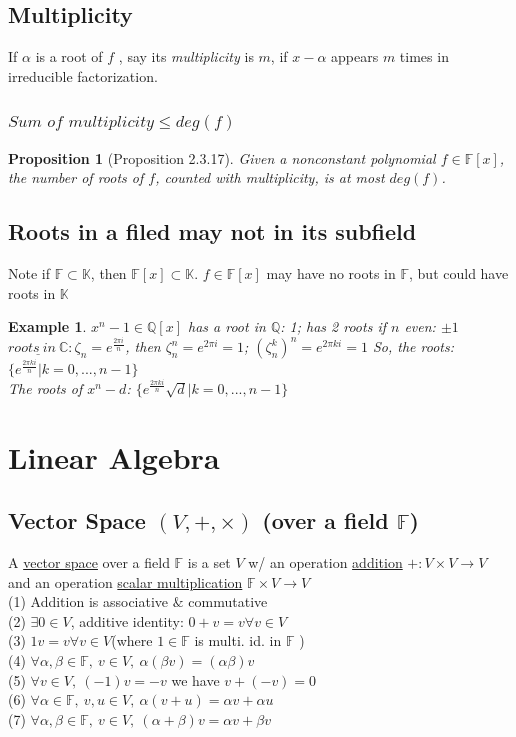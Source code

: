 \documentclass[11pt,a4paper]{article}
\newtheorem{proposition}{Proposition}
\newtheorem{example}{Example}
\begin{document}
\subsection{Multiplicity}
If $\alpha$ is a root of $f$ , say its \textit{multiplicity} is $m$, if $x-\alpha$ appears $m$ times in irreducible factorization.
\subsubsection{$\textit{Sum of multiplicity}\leq deg(f)$}
\begin{proposition}[Proposition 2.3.17]
Given a nonconstant polynomial $f\in\mathbb{F}[x]$, the number of roots of $f$, counted with multiplicity, is at most $deg(f)$.
\end{proposition}

\subsection{Roots in a filed may not in its subfield}
Note if $\mathbb{F}\subset \mathbb{K}$, then $\mathbb{F}[x]\subset\mathbb{K}$. $f\in\mathbb{F}[x]$ may have no roots in $\mathbb{F}$, but could have roots in $\mathbb{K}$
\begin{example}
    $x^n-1\in\mathbb{Q}[x]$ has a root in $\mathbb{Q}$: 1; has 2 roots if $n$ even: $\pm 1$\\
    $\underline{roots\ in\ \mathbb{C}}:\zeta_n=e^{\frac{2\pi i}{n}}$, then $\zeta_n^n=e^{2\pi i}=1$; $(\zeta_n^k)^n=e^{2\pi ki}=1$ So, the roots: $\{e^{\frac{2\pi ki}{n}}|k=0,...,n-1\}$\\
    The roots of $x^n-d$: $\{e^{\frac{2\pi ki}{n}}\sqrt{d}|k=0,...,n-1\}$\\
\end{example}

\section{Linear Algebra}
\subsection{ Vector Space $(V,+,\times)$ (over a field $\mathbb{F}$)}
A \underline{vector space} over a field $\mathbb{F}$ is a
set $V$ w/ an operation \underline{addition} $+ : V \times V \rightarrow V$ and
an operation \underline{scalar multiplication} $\mathbb{F} \times V \rightarrow V$\\
(1) Addition is associative $\&$ commutative\\
(2) $\exists 0\in V$, additive identity: $0 + v = v \forall v \in V$\\
(3) $1v = v \forall v \in V$(where $1 \in \mathbb{F}$ is multi. id. in $\mathbb{F}$ )\\
(4) $\forall \alpha,\beta\in\mathbb{F},\ v\in V,\ \alpha(\beta v)=(\alpha\beta)v$\\
(5) $\forall v\in V,\ (-1)v=-v$ we have $v+(-v)=0$\\
(6) $\forall \alpha\in\mathbb{F},\ v,u\in V,\ \alpha(v+u)=\alpha v+\alpha u$\\
(7) $\forall \alpha,\beta\in\mathbb{F},\ v\in V,\ (\alpha+\beta)v=\alpha v+\beta v$
\end{document}
